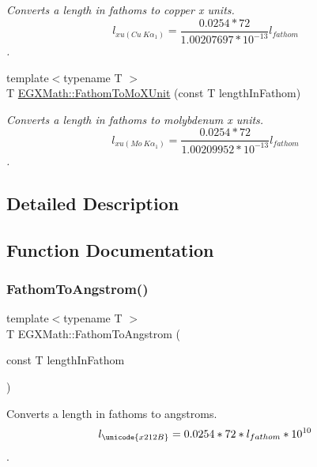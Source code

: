 \begin{DoxyCompactItemize}
\begin{DoxyCompactList}\small\item\em Converts a length in fathoms to copper x units. \[ l_{xu(Cu\ K\alpha_1)}=\frac{0.0254 * 72}{1.00207697*10^{-13}} l_{fathom}\]. \end{DoxyCompactList}\item 
{\footnotesize template$<$typename T $>$ }\\T \mbox{\hyperlink{group___e_g_x_math-_conversions-_length_conversions-_nautical-_fathom-_non-_s_i_ga1e69cf778d1b7f72cd015b6cc81fc71c}{E\+G\+X\+Math\+::\+Fathom\+To\+Mo\+X\+Unit}} (const T length\+In\+Fathom)
\begin{DoxyCompactList}\small\item\em Converts a length in fathoms to molybdenum x units. \[ l_{xu(Mo\ K\alpha_1)}=\frac{0.0254 * 72}{1.00209952*10^{-13}} l_{fathom}\]. \end{DoxyCompactList}\end{DoxyCompactItemize}


\subsection{Detailed Description}


\subsection{Function Documentation}
\mbox{\label{group___e_g_x_math-_conversions-_length_conversions-_nautical-_fathom-_non-_s_i_gac03859840078c2a19cbf1f79bcf2b919}} 
\subsubsection{\texorpdfstring{Fathom\+To\+Angstrom()}{FathomToAngstrom()}}
{\footnotesize\ttfamily template$<$typename T $>$ \\
T E\+G\+X\+Math\+::\+Fathom\+To\+Angstrom (\begin{DoxyParamCaption}\item[{const T}]{length\+In\+Fathom }\end{DoxyParamCaption})}



Converts a length in fathoms to angstroms. \[ l_{\unicode{x212B}}=0.0254 * 72 * l_{fathom} * 10^{10} \]. 

